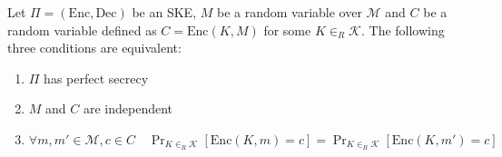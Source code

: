 \documentclass[a4paper, 12pt]{report}
\begin{document}
\begin{framedlem}{}
	Let $\Pi = (\mbox{Enc}, \mbox{Dec})$ be an SKE, $M$ be a random variable over $\mathcal M$ and $C$ be a random variable defined as $C = \mbox{Enc}(K, M)$ for some $K \in_R \mathcal K$. The following three conditions are equivalent:

	\begin{enumerate}
		\item $\Pi$ has perfect secrecy
		\item $M$ and $C$ are independent
		\item $\forall m, m' \in \mathcal M, c \in C \quad \Pr_{K \in_R \mathcal K}[\mathrm{Enc}(K, m) = c] = \Pr_{K \in_R \mathcal K}[\mathrm{Enc}(K, m') = c]$
	\end{enumerate}
\end{framedlem}
\end{document}
